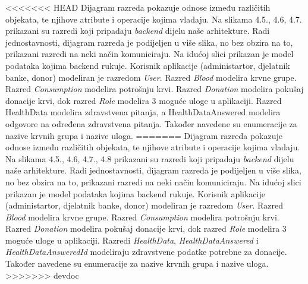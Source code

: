 <<<<<<< HEAD
	Dijagram razreda pokazuje odnose između različitih objekata, te njihove atribute i operacije kojima vladaju. Na slikama 4.5., 4.6, 4.7. prikazani su razredi koji pripadaju \textit{backend} dijelu naše arhitekture. Radi jednostavnosti, dijagram razreda je podijeljen u više slika, no bez obzira na to, prikazani razredi na neki način komuniciraju.
	Na idućoj slici prikazan je model podataka kojima backend rukuje. Korisnik aplikacije (administartor, djelatnik banke, donor) modeliran je razredom \textit{User}. Razred \textit{Blood} modelira krvne grupe. Razred \textit{Consumption} modelira potrošnju krvi. Razred \textit{Donation} modelira pokušaj donacije krvi, dok razred \textit{Role} modelira 3 moguće uloge u aplikaciji. Razred HealthData modelira zdravstvena pitanja, a HealthDataAnswered modelira odgovore na određena zdravstvena pitanja. Također navedene su enumeracije za nazive krvnih grupa i nazive uloga.
=======
	Dijagram razreda pokazuje odnose između različitih objekata, te njihove atribute i operacije kojima vladaju. Na slikama 4.5., 4.6, 4.7., 4.8 prikazani su razredi koji pripadaju \textit{backend} dijelu naše arhitekture. Radi jednostavnosti, dijagram razreda je podijeljen u više slika, no bez obzira na to, prikazani razredi na neki način komuniciraju.
	Na idućoj slici prikazan je model podataka kojima backend rukuje. Korisnik aplikacije (administartor, djelatnik banke, donor) modeliran je razredom \textit{User}. Razred \textit{Blood} modelira krvne grupe. Razred \textit{Consumption} modelira potrošnju krvi. Razred \textit{Donation} modelira pokušaj donacije krvi, dok razred \textit{Role} modelira 3 moguće uloge u aplikaciji. Razredi \textit{HealthData}, \textit{HealthDataAnswered} i \textit{HealthDataAnsweredId} modeliraju zdravstvene podatke potrebne za donacije. Također navedene su enumeracije za nazive krvnih grupa i nazive uloga.
>>>>>>> devdoc
